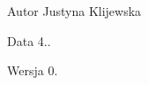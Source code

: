 \begin{DoxyAuthor}{Autor}
Justyna Klijewska 
\end{DoxyAuthor}
\begin{DoxyDate}{Data}
4.. 
\end{DoxyDate}
\begin{DoxyVersion}{Wersja}
0. 
\end{DoxyVersion}
